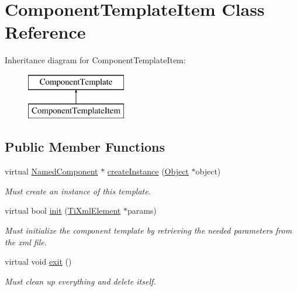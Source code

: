 \hypertarget{classComponentTemplateItem}{
\section{\-Component\-Template\-Item \-Class \-Reference}
\label{d7/d46/classComponentTemplateItem}
}
\-Inheritance diagram for \-Component\-Template\-Item\-:\begin{figure}[H]
\begin{center}
\leavevmode
\includegraphics[height=2.000000cm]{d7/d46/classComponentTemplateItem}
\end{center}
\end{figure}
\subsection*{\-Public \-Member \-Functions}
\begin{DoxyCompactItemize}
\item 
\hypertarget{classComponentTemplateItem_a9b2d9c158acee616b4b98bad6d611634}{
virtual \hyperlink{classNamedComponent}{\-Named\-Component} $\ast$ \hyperlink{classComponentTemplateItem_a9b2d9c158acee616b4b98bad6d611634}{create\-Instance} (\hyperlink{classObject}{\-Object} $\ast$object)}
\label{d7/d46/classComponentTemplateItem_a9b2d9c158acee616b4b98bad6d611634}

\begin{DoxyCompactList}\small\item\em \-Must create an instance of this template. \end{DoxyCompactList}\item 
\hypertarget{classComponentTemplateItem_a4640489906246ecab82178af004c126e}{
virtual bool \hyperlink{classComponentTemplateItem_a4640489906246ecab82178af004c126e}{init} (\hyperlink{classTiXmlElement}{\-Ti\-Xml\-Element} $\ast$params)}
\label{d7/d46/classComponentTemplateItem_a4640489906246ecab82178af004c126e}

\begin{DoxyCompactList}\small\item\em \-Must initialize the component template by retrieving the needed parameters from the xml file. \end{DoxyCompactList}\item 
\hypertarget{classComponentTemplateItem_a85e6a842bb7a6785fc30d9a9a2cf1be0}{
virtual void \hyperlink{classComponentTemplateItem_a85e6a842bb7a6785fc30d9a9a2cf1be0}{exit} ()}
\label{d7/d46/classComponentTemplateItem_a85e6a842bb7a6785fc30d9a9a2cf1be0}

\begin{DoxyCompactList}\small\item\em \-Must clean up everything and delete itself. \end{DoxyCompactList}\end{DoxyCompactItemize}
